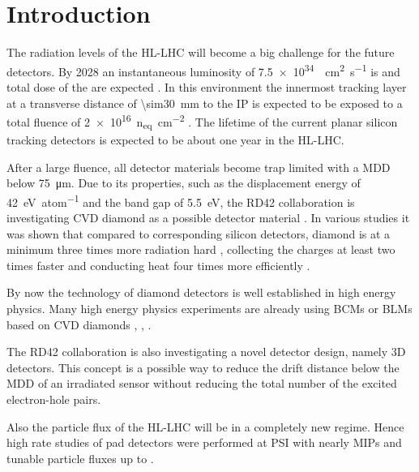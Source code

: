\section{Introduction}
The radiation levels of the \ac{HL-LHC} will become a big challenge for the future detectors. By 2028 an instantaneous luminosity of \SI{7.5e34}{\per\centi\meter\squared\per\second} is and total dose of the  are expected \cite{dose}. In this environment the innermost tracking layer at a transverse distance of \SI{\sim30}{\milli\meter} to the \acl{IP} is expected to be exposed to a total fluence of \SI{2e16}{n_{eq}\per \centi\meter^2} \cite{auzinger}. The lifetime of the current planar silicon tracking detectors is expected to be about one year in the \ac{HL-LHC}. \par
After a large fluence, all detector materials become trap limited with a \acl{MDD} below \SI{75}{\micro\meter}. Due to its properties, such as the displacement energy of \SI{42}{\electronvolt\per atom} and the band gap of \SI{5.5}{\electronvolt}, the RD42 collaboration is investigating \ac{CVD} diamond as a possible detector material \cite{rd42}. In various studies it was shown that compared to corresponding silicon detectors, diamond is at a minimum three times more radiation hard \cite{deboer}, collecting the charges at least two times faster \cite{pernegger} and conducting heat four times more efficiently \cite{zhao}.\par
By now the technology of diamond detectors is well established in high energy physics. Many high energy physics experiments are already using \aclp{BCM} or \aclp{BLM} based on \ac{CVD} diamonds \cite{babar}, \cite{bcm}, \cite{dbm1}.\par
The RD42 collaboration is also investigating a novel detector design, namely 3D detectors. This concept is a possible way to reduce the drift distance below the \acl{MDD} of an irradiated sensor without reducing the total number of the excited electron-hole pairs.\par
Also the particle flux of the \ac{HL-LHC} will be in a completely new regime. Hence high rate studies of pad detectors were performed at \ac{PSI} with nearly \acp{MIP} and tunable particle fluxes up to .
